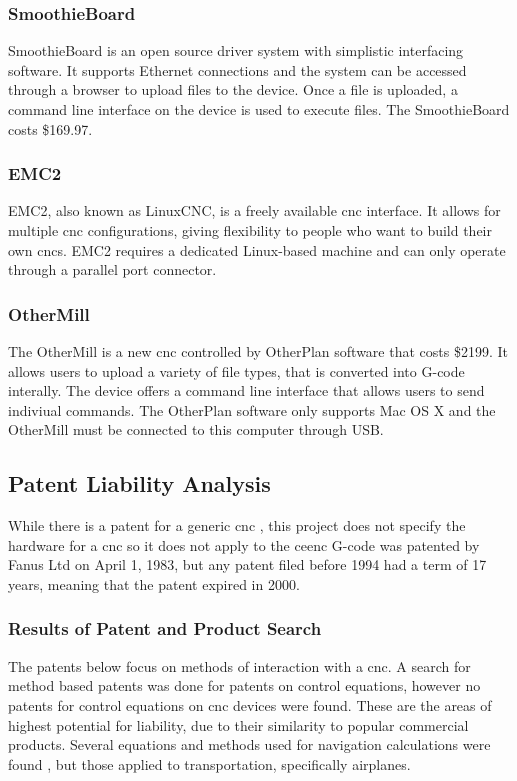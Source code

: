 \subsubsection{SmoothieBoard}
SmoothieBoard is an open source driver system with simplistic interfacing software.
It supports Ethernet connections and the system can be accessed through a browser to upload files to the device.
Once a file is uploaded, a command line interface on the device is used to execute files.
The SmoothieBoard costs \$169.97.

\subsubsection{EMC2}
EMC2, also known as LinuxCNC, is a freely available \gls{cnc} interface.
It allows for multiple \gls{cnc} configurations, giving flexibility to people who want to build their own \gls{cnc}s.
EMC2 requires a dedicated Linux-based machine and can only operate through a parallel port connector.

\subsubsection{OtherMill}
The OtherMill is a new \gls{cnc} controlled by OtherPlan software that costs \$2199.
It allows users to upload a variety of file types, that is converted into G-code interally.
The device offers a command line interface that allows users to send indiviual commands.
The OtherPlan software only supports Mac OS X and the OtherMill must be connected to this computer through USB.

\subsection{Patent Liability Analysis}
While there is a patent for a generic \gls{cnc}  \cite{3cncpatent}
, this project does not specify the hardware for a \gls{cnc} so it does not apply to the \gls{ceenc}
G-code was patented by Fanus Ltd  \cite{controlmethodpatent} on April 1, 1983, but any patent filed before 1994 had a term of 17 years, meaning that the patent expired in 2000.

\subsubsection{Results of Patent and Product Search}
The patents below focus on methods of interaction with a \gls{cnc}.
A search for method based patents was done for patents on control equations, however no patents for control equations on \gls{cnc} devices were found.
These are the areas of highest potential for liability, due to their similarity to popular commercial products.
Several equations and methods used for navigation calculations were found \cite{navpatent}, but those applied to transportation, specifically airplanes.

